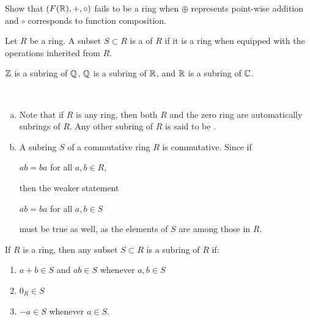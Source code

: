 \documentclass[11pt,fleqn,dvipsnames,usenames]{article}
\begin{document}
%
\begin{exercise}
Show that $(F(\mathbb{R}), +, \circ)$ fails to be a ring when $\oplus$ represents point-wise addition and $\circ$ corresponds to function composition.
\end{exercise}
%
\begin{definition}
Let $R$ be a ring.  A subset $S\subset R$ is a  of $R$ if it is a ring when equipped with the operations inherited from $R$.
\end{definition}
%
\begin{example}
$\mathbb{Z}$ is a subring of $\mathbb{Q}$, $\mathbb{Q}$ is a subring of $\mathbb{R}$, and $\mathbb{R}$ is a subring of $\mathbb{C}$.
\end{example}
%
\begin{remarks}~
\begin{enumerate}[(a)]
\item Note that if $R$ is any ring, then both $R$ and the zero ring are automatically subrings of $R$.  Any other subring of $R$ is said to be .
\item A subring $S$ of a commutative ring $R$ is commutative.  Since if
\begin{center}
$ab = ba$ for all $a,b\in R$,
\end{center}
then the weaker statement
\begin{center}
$ab = ba$ for all $a,b\in S$
\end{center}
must be true as well, as the elements of $S$ are among those in $R$.
\end{enumerate}
\end{remarks}
%
\begin{theorem}\label{subringcriterion}
If $R$ is a ring, then any subset $S\subset R$ is a subring of $R$ if:
\begin{enumerate}[(1)]
\item $a+b\in S$ and $ab\in S$ whenever $a,b\in S$
\item $0_{R}\in S$
\item $-a\in S$ whenever $a\in S$.
\end{enumerate}
\end{theorem}
%
\end{document}
